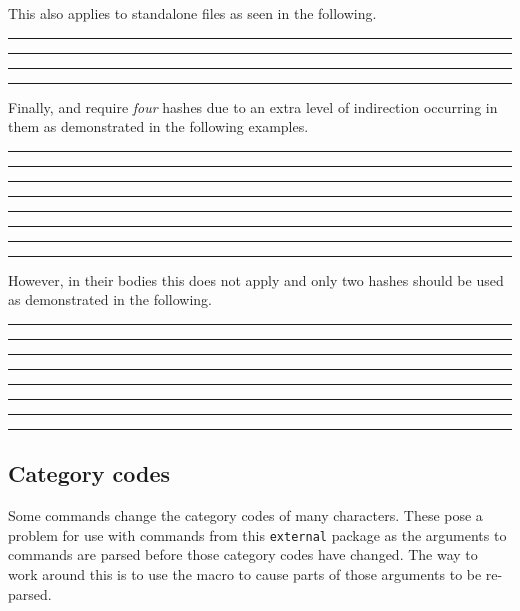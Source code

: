 \documentclass[10pt]{ltxdoc}
\newcommand{\pkg}[1]{\texttt{#1}}
\newcommand{\showfile}[1]{
  \begin{tcolorbox}[title=\texttt{#1}]
  
  \end{tcolorbox}
}
\def\gauge{%
  \rule{0.2em}{7pt}%
  \llap{\rule[8pt]{0.2em}{2pt}}%
}
\begin{document}
This also applies to standalone files as seen in the following.

\showfile{example-standalone-hash.tex}

\begin{tcblisting}{}
\gauge\ExternalCompile[file=example-standalone-hash]\gauge

\gauge\ExternalRead[file=example-standalone-hash]\gauge
\end{tcblisting}

Finally,  and  require \textit{four}
hashes due to an extra level of indirection occurring in them as
demonstrated in the following examples.

\begin{tcblisting}{}
\gauge
\newexternal[preamble={\newcommand{\parens}[1]{(####1)}}]{\paren}%
\gauge

\gauge{}\gauge
\end{tcblisting}

\begin{tcblisting}{}
\gauge
{}%
\gauge

\gauge
\begin{paren}
\end{paren}
\gauge
\end{tcblisting}

However, in their bodies this does not apply and only two hashes should be used
as demonstrated in the following.

\begin{tcblisting}{}
\gauge\newexternal{\paren}\gauge

\gauge{}\gauge
\end{tcblisting}

\begin{tcblisting}{}
\gauge{}\gauge

\gauge
{}
\gauge
\end{tcblisting}

\subsection{Category codes}
\label{subsec:Catcodes}

Some commands change the category codes of many characters.
These pose a problem for use with commands from this \pkg{external}
package as the arguments to commands are parsed before those category
codes have changed.
The way to work around this is to use the  macro to
cause parts of those arguments to be re-parsed.
\end{document}
